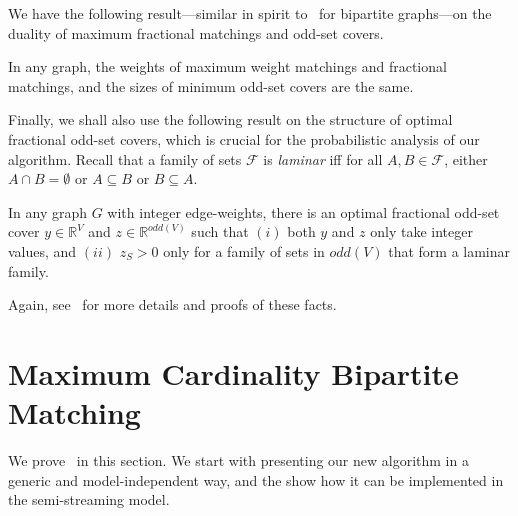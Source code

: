 \documentclass{theoretics}
\newcommand{\IR}{\mathbb{R}}
\begin{document}
We have the following result---similar in spirit to~ for bipartite graphs---on the duality of maximum fractional matchings and odd-set covers. 

\begin{fact}\label{fact:edmonds}
In any graph, the weights of maximum weight matchings and fractional matchings, and the sizes of minimum odd-set covers are the same. 
\end{fact}

Finally, we shall also use the following result on the structure of optimal fractional odd-set covers, which is crucial for the probabilistic analysis of our algorithm. 
Recall that a family of sets $\mathcal{F}$ is \emph{laminar} iff for all $A,B \in \mathcal{F}$, either $A \cap B = \emptyset$ or $A \subseteq B$ or $B \subseteq A$.

\begin{fact}\label{fact:cunningham-marsh}
	In any graph $G$ with integer edge-weights, there is an optimal fractional odd-set cover $y \in \IR^V$ and $z \in \IR^{odd(V)}$ such that $(i)$ both $y$ and $z$ only take integer values, 
	and $(ii)$  $z_S > 0$ only for a family of sets in $odd(V)$ that form a laminar family. 
\end{fact}

Again, see~\cite{LovaszP09} for more details and proofs of these facts. 

\section{Maximum Cardinality Bipartite Matching}\label{sec:bipartite}

We prove~ in this section.  We start with presenting our new algorithm in a generic and model-independent way, and the show how it can be implemented in the semi-streaming model. 
\end{document}
